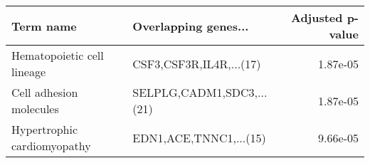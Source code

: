 \begin{tabular}{llr}
\toprule
                  Term name &      Overlapping genes... &  Adjusted p-value \\
\midrule
 Hematopoietic cell lineage &   CSF3,CSF3R,IL4R,...(17) &          1.87e-05 \\
    Cell adhesion molecules & SELPLG,CADM1,SDC3,...(21) &          1.87e-05 \\
Hypertrophic cardiomyopathy &    EDN1,ACE,TNNC1,...(15) &          9.66e-05 \\
\bottomrule
\end{tabular}
